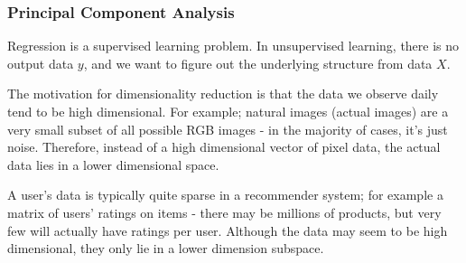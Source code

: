 \documentclass[a4paper, 12pt]{article}
\begin{document}
            \subsubsection*{Principal Component Analysis}
                Regression is a supervised learning problem.
                In unsupervised learning, there is no output data $y$, and we want to figure out the underlying structure from data $X$.
                \medskip

                The motivation for dimensionality reduction is that the data we observe daily tend to be high dimensional.
                For example; natural images (actual images) are a very small subset of all possible RGB images - in the majority of cases, it's just noise.
                Therefore, instead of a high dimensional vector of pixel data, the actual data lies in a lower dimensional space.
                \medskip

                A user's data is typically quite sparse in a recommender system; for example a matrix of users' ratings on items - there may be millions of products, but very few will actually have ratings per user.
                Although the data may seem to be high dimensional, they only lie in a lower dimension subspace.
                \medskip
\end{document}
